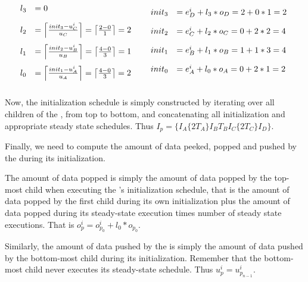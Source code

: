 \begin{displaymath}
\begin{array}{lr}
\begin{array}{rl}
l_3 & = 0 \raisebox{-0.2in}{ } \\
l_2 & = \left\lceil init_3 - u^i_C \over u_C \right\rceil = \left\lceil 2 - 0 \over 1 \right\rceil = 2 \raisebox{-0.2in}{ } \\
l_1 & = \left\lceil init_2 - u^i_B \over u_B \right\rceil =
\left\lceil 4 - 0 \over 3 \right\rceil = 1 \raisebox{-0.2in}{ } \\
l_0 & = \left\lceil init_1 - u^i_A \over u_A \right\rceil =
\left\lceil 4 - 0 \over 3 \right\rceil = 2 \raisebox{-0.2in}{ } \\
\end{array} &
\begin{array}{rl}
init_3 & = e^i_D + l_3 * o_D = 2 + 0 * 1 = 2 \raisebox{-0.2in}{ }\\
init_2 & = e^i_C + l_2 * o_C = 0 + 2 * 2 = 4 \raisebox{-0.2in}{ }\\
init_1 & = e^i_B + l_1 * o_B = 1 + 1 * 3 = 4 \raisebox{-0.2in}{ }\\
init_0 & = e^i_A + l_0 * o_A = 0 + 2 * 1 = 2 \raisebox{-0.2in}{ }\\
\end{array}
\end{array}
\end{displaymath}

Now, the initialization schedule is simply constructed by
iterating over all children of the {\pipeline}, from top to
bottom, and concatenating all initialization and appropriate
steady state schedules.  Thus $I_p = \{I_A\{2T_A\} I_{B}T_B
I_C\{2T_C\} I_D\}$.

Finally, we need to compute the amount of data peeked, popped and
pushed by the {\pipeline} during its initialization.

The amount of data popped is simply the amount of data popped by
the top-most child when executing the {\pipeline}'s initialization
schedule, that is the amount of data popped by the first child
during its own initialization plus the amount of data popped
during its steady-state execution times number of steady state
executions. That is $o^i_p = o^i_{p_0} + l_0 * o_{p_0}$.

Similarly, the amount of data pushed by the {\pipeline} is simply
the amount of data pushed by the bottom-most child during its
initialization. Remember that the bottom-most child never executes
its steady-state schedule.  Thus $u^i_p = u^i_{p_{n-1}}$.

